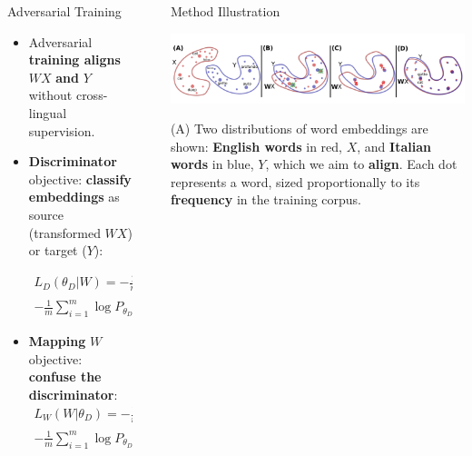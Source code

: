 \documentclass[final]{beamer}
\newlength{\sepwid}
\newlength{\onecolwid}
\newlength{\twocolwid}
\begin{document}
\begin{frame}[t]
\begin{columns}[t]
\begin{column}{\onecolwid}

\begin{block}{Adversarial Training}
   \begin{itemize}
        \item Adversarial \textbf{training aligns} \( WX \) \textbf{and} \( Y \) without cross-lingual supervision.
        \item \textbf{Discriminator} objective: \textbf{classify embeddings} as source (transformed \( WX \)) or target (\( Y \)):
        
       \begin{equation*}
\begin{split}
    L_D(\theta_D | W) = - \frac{1}{n} \sum_{i=1}^n \log P_{\theta_D}(source = 1 | W x_i) \\
    - \frac{1}{m} \sum_{i=1}^m \log P_{\theta_D}(source = 0 | y_i)
\end{split}
\end{equation*}
	
        \item \textbf{Mapping} \( W \) objective: \textbf{confuse the discriminator}:
\begin{equation*}
\begin{split}
    L_W(W | \theta_D) = - \frac{1}{n} \sum_{i=1}^n \log P_{\theta_D}(source = 0 | W x_i) \\
    - \frac{1}{m} \sum_{i=1}^m \log P_{\theta_D}(source = 1 | y_i)
\end{split}
\end{equation*}
    \end{itemize}
\end{block}



\end{column} 

\begin{column}{\sepwid}\end{column} 

\begin{column}{\twocolwid}



\begin{block}{Method Illustration}
\begin{center}
    \includegraphics[width=1.0\linewidth, height=0.25\textheight]{figures/figure1.png}
\end{center}
(A) Two distributions of word embeddings are shown: \textbf{English words} in red, \(X\), and \textbf{Italian words} in blue, \(Y\), which we aim to \textbf{align}. Each dot represents a word, sized proportionally to its \textbf{frequency} in the training corpus. 


\end{block}
\end{column}
\end{columns}
\end{frame}
\end{document}

